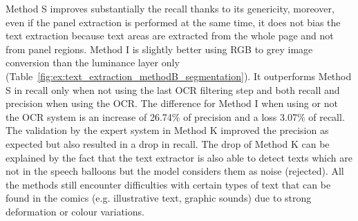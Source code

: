 Method S improves substantially the recall thanks to its genericity, moreover, even if the panel extraction is performed at the same time, it does not bias the text extraction because text areas are extracted from the whole page and not from panel regions.
Method I is slightly better using RGB to grey image conversion than the luminance layer only (Table~\ref{fig:ex:text_extraction_methodB_segmentation}).
It outperforms Method S in recall only when not using the last OCR filtering step and both recall and precision when using the OCR.
The difference for Method I when using or not the OCR system is an increase of 26.74\% of precision and a loss 3.07\% of recall.
The validation by the expert system in Method K improved the precision as expected but also resulted in a drop in recall.
The drop of Method K can be explained by the fact that the text extractor is also able to detect texts which are not in the speech balloons but the model considers them as noise (rejected).
All the methods still encounter difficulties with certain types of text that can be found in the comics (e.g. illustrative text, graphic sounds) due to strong deformation or colour variations.


